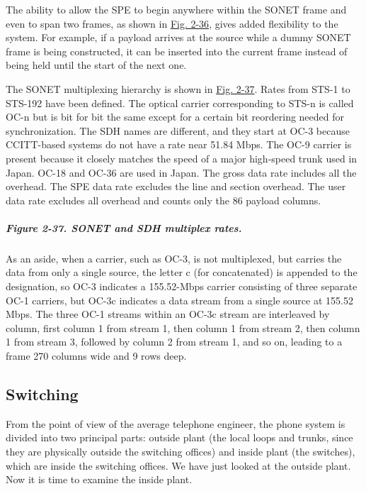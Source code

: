 The ability to allow the SPE to begin anywhere within the SONET frame
and even to span two frames, as shown in
\protect\hyperlink{0130661023_ch02lev1sec5.htmlux5cux23ch02fig36}{Fig.
2-36}, gives added flexibility to the system. For example, if a payload
arrives at the source while a dummy SONET frame is being constructed, it
can be inserted into the current frame instead of being held until the
start of the next one.

The SONET multiplexing hierarchy is shown in
\protect\hyperlink{0130661023_ch02lev1sec5.htmlux5cux23ch02fig37}{Fig.
2-37}. Rates from STS-1 to STS-192 have been defined. The optical
carrier corresponding to STS-{n} is called OC-{n} but is bit for bit the
same except for a certain bit reordering needed for synchronization. The
SDH names are different, and they start at OC-3 because CCITT-based
systems do not have a rate near 51.84 Mbps. The OC-9 carrier is present
because it closely matches the speed of a major high-speed trunk used in
Japan. OC-18 and OC-36 are used in Japan. The gross data rate includes
all the overhead. The SPE data rate excludes the line and section
overhead. The user data rate excludes all overhead and counts only the
86 payload columns.

\subparagraph[Figure 2-37. SONET and SDH multiplex
rates.]{\texorpdfstring{\protect\hypertarget{0130661023_ch02lev1sec5.htmlux5cux23ch02fig37}{}{}Figure
2-37. SONET and SDH multiplex
rates.}{Figure 2-37. SONET and SDH multiplex rates.}}


As an aside, when a carrier, such as OC-3, is not multiplexed, but
carries the data from only a single source, the letter {c} (for
concatenated) is appended to the designation, so OC-3 indicates a
155.52-Mbps carrier consisting of three separate OC-1 carriers, but
OC-3c indicates a data stream from a single source at 155.52 Mbps. The
three OC-1 streams within an OC-3c stream are interleaved by column,
first column 1 from stream 1, then column 1 from stream 2, then column 1
from stream 3, followed by column 2 from stream 1, and so on, leading to
a frame 270 columns wide and 9 rows deep.

\protect\hypertarget{0130661023_ch02lev1sec5.htmlux5cux23ch02lev2sec21}{}{}

\subsection{Switching}

From the point of view of the average telephone engineer, the phone
system is divided into two principal parts: outside plant (the local
loops and trunks, since they are physically outside the switching
offices) and inside plant (the switches), which are inside the switching
offices. We have just looked at the outside plant. Now it is time to
examine the inside plant.

